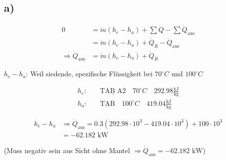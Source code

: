 

\subsection*{a)}
\begin{align*}
0 &= \dot{m} (h_e - h_a) + \sum \dot{Q} - \sum \dot{Q}_\text{aus} \\
  &= \dot{m} (h_e - h_a) + \dot{Q}_R - \dot{Q}_\text{aus} \\
\Rightarrow \dot{Q}_\text{aus} &= \dot{m} (h_e - h_a) + \dot{Q}_R
\end{align*}

$h_e - h_a$: Weil siedende, spezifische Flüssigkeit bei $70^\circ C$ und $100^\circ C$

\begin{align*}
h_e: & \quad \underline{\text{TAB A2}} \quad 70^\circ C \quad 292.98 \frac{\text{kJ}}{\text{kg}} \\
h_a: & \quad \underline{\text{TAB}} \quad 100^\circ C \quad 419.04 \frac{\text{kJ}}{\text{kg}}
\end{align*}

\begin{align*}
h_e - h_a &\Rightarrow \dot{Q}_\text{aus} = 0.3 \left( 292.98 \cdot 10^3 - 419.04 \cdot 10^3 \right) + 100 \cdot 10^3 \\
          &= -62.182 \text{ kW}
\end{align*}

(Muss negativ sein aus Sicht ohne Mantel $\Rightarrow \dot{Q}_\text{aus} = -62.182 \text{ kW}$)